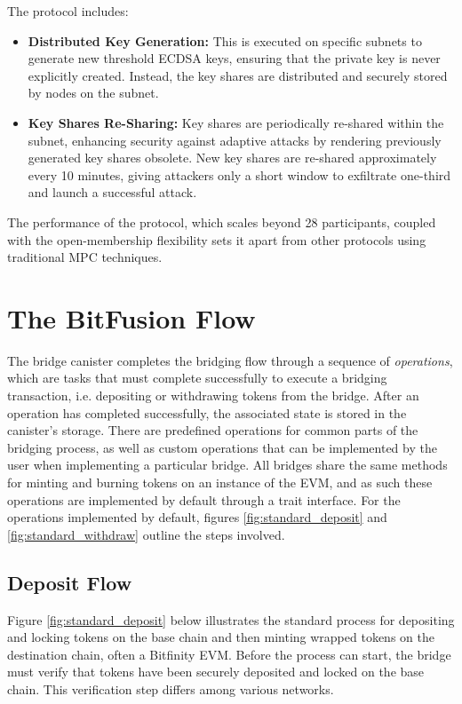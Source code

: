 \documentclass{article}
\begin{document}
The protocol includes:

\begin{itemize}
\item \textbf{Distributed Key Generation:} This is executed on specific subnets to generate new threshold ECDSA keys, ensuring that the private key is never explicitly created. Instead, the key shares are distributed and securely stored by nodes on the subnet.

\item \textbf{Key Shares Re-Sharing:} Key shares are periodically re-shared within the subnet, enhancing security against adaptive attacks by rendering previously generated key shares obsolete. New key shares are re-shared approximately every 10 minutes, giving attackers only a short window to exfiltrate one-third and launch a successful attack.
\end{itemize}

The performance of the protocol, which scales beyond 28 participants, coupled with the open-membership flexibility sets it apart from other protocols using traditional MPC techniques.   


\section{The BitFusion Flow}

The bridge canister completes the bridging flow through a sequence of \textit{operations}, which are tasks that must complete successfully to execute a bridging transaction, i.e. depositing or withdrawing tokens from the bridge. After an operation has completed successfully, the associated state is stored in the canister's storage. There are predefined operations for common parts of the bridging process, as well as custom operations that can be implemented by the user when implementing a particular bridge. All bridges share the same methods for minting and burning tokens on an instance of the EVM, and as such these operations are implemented by default through a trait interface. For the operations implemented by default, figures \ref{fig:standard_deposit} and \ref{fig:standard_withdraw} outline the steps involved. 

\subsection{Deposit Flow}

Figure \ref{fig:standard_deposit} below illustrates the standard process for depositing and locking tokens on the base chain and then minting wrapped tokens on the destination chain, often a Bitfinity EVM. Before the process can start, the bridge must verify that tokens have been securely deposited and locked on the base chain. This verification step differs among various networks.
\end{document}

